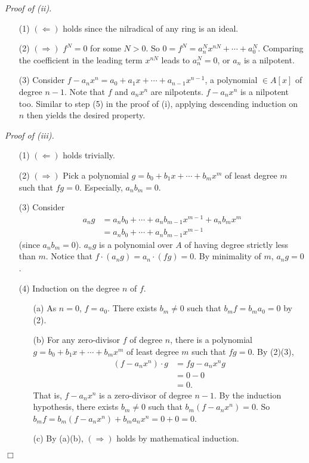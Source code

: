 \documentclass{article}
\begin{document}
\emph{Proof of (ii).}
\begin{enumerate}
\item[(1)]
$(\Longleftarrow)$ holds since the nilradical of any ring is an ideal.
\item[(2)]
$(\Longrightarrow)$ $f^N = 0$ for some $N > 0$.
So $0 = f^N = a_n^N x^{nN} + \cdots + a_0^N$.
Comparing the coefficient in the leading term $x^{nN}$ leads to $a_n^N = 0$,
or $a_n$ is a nilpotent.
\item[(3)]
Consider $f - a_n x^n = a_0 + a_1 x + \cdots + a_{n-1} x^{n-1}$,
a polynomial $\in A[x]$ of degree $n-1$.
Note that $f$ and $a_n x^n$ are nilpotents.
$f - a_n x^n$ is a nilpotent too.
Similar to step (5) in the proof of (i),
applying descending induction on $n$ then yields the desired property.
\end{enumerate}

\emph{Proof of (iii).}
\begin{enumerate}
\item[(1)]
$(\Longleftarrow)$ holds trivially.
\item[(2)]
$(\Longrightarrow)$
Pick a polynomial $g = b_0 + b_1 x + \cdots + b_m x^m$
of least degree $m$ such that $fg = 0$.
Especially, $a_n b_m = 0$.
\item[(3)]
Consider
\begin{align*}
a_n g
&= a_n b_0 + \cdots + a_n b_{m-1} x^{m-1} + a_n b_m x^m \\
&= a_n b_0 + \cdots + a_n b_{m-1} x^{m-1}
\end{align*}
(since $a_n b_m = 0$).
$a_n g$ is a polynomial over $A$ of having degree strictly less than $m$.
Notice that $f \cdot (a_n g) = a_n \cdot (fg)= 0$.
By minimality of $m$, $a_n g = 0$.
\item[(4)]
Induction on the degree $n$ of $f$.
\begin{enumerate}
\item[(a)]
As $n = 0$, $f = a_0$. There exists $b_m \neq 0$ such that $b_m f = b_m a_0 = 0$ by (2).
\item[(b)]
For any zero-divisor $f$ of degree $n$,
there is a polynomial $g = b_0 + b_1 x + \cdots + b_m x^m$
of least degree $m$ such that $fg = 0$. By (2)(3),
\begin{align*}
(f - a_n x^n) \cdot g
&= fg - a_n x^n g \\
&= 0 - 0 \\
&= 0.
\end{align*}
That is, $f - a_n x^n$ is a zero-divisor of degree $n-1$.
By the induction hypothesis,
there exists $b_m \neq 0$ such that $b_{m}(f - a_n x^n) = 0$.
So $b_m f = b_{m}(f - a_n x^n) + b_m a_n x^n = 0 + 0 = 0$.
\item[(c)]
By (a)(b), $(\Longrightarrow)$ holds by mathematical induction.
\end{enumerate}
\end{enumerate}
$\Box$ \\
\end{document}
